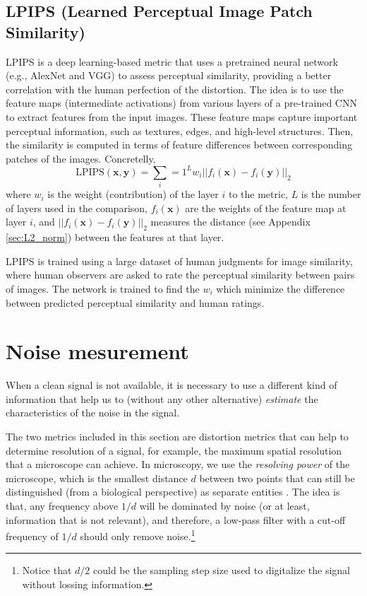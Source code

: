 \documentclass{article}
\begin{document}
\subsection{LPIPS (Learned Perceptual Image Patch Similarity)}

LPIPS \cite{zhang2018unreasonable} is a deep learning-based metric that
uses a pretrained neural network (e.g., AlexNet and VGG) to assess
perceptual similarity, providing a better correlation with the human
perfection of the distortion. The idea is to use the feature maps
(intermediate activations) from various layers of a pre-trained CNN to
extract features from the input images. These feature maps capture
important perceptual information, such as textures, edges, and
high-level structures. Then, the similarity is computed in terms of
feature differences between corresponding patches of the
images. Concretelly,
\begin{equation}
  \text{LPIPS}(\mathbf{x}, \mathbf{y}) = \sum_i=1^Lw_i||f_i(\mathbf{x}) - f_i(\mathbf{y})||_2
\end{equation}
where $w_i$ is the weight (contribution) of the layer $i$ to the
metric, $L$ is the number of layers used in the comparison,
$f_i(\mathbf{x})$ are the weights of the feature map at layer $i$, and
$||f_i(\mathbf{x}) - f_i(\mathbf{y})||_2$ measures the distance (see
Appendix \ref{sec:L2_norm}) between the features at that layer.

LPIPS is trained using a large dataset of human judgments for image
similarity, where human observers are asked to rate the perceptual
similarity between pairs of images. The network is trained to find the
$w_i$ which minimize the difference between predicted perceptual
similarity and human ratings.



\section{Noise mesurement}

When a clean signal is not available, it is necessary to use a
different kind of information that help us to (without any other
alternative) \emph{estimate} the characteristics of the noise in the
signal.

The two metrics included in this section are distortion metrics that
can help to determine resolution of a signal, for example, the maximum
spatial resolution that a microscope can achieve. In microscopy, we
use the \emph{resolving power} of the microscope, which is the
smallest distance $d$ between two points that can still be
distinguished (from a biological perspective) as separate entities
\cite{nieuwenhuizen2013measuring}. The idea is that, any frequency
above $1/d$ will be dominated by noise (or at least, information that
is not relevant), and therefore, a low-pass filter with a cut-off
frequency of $1/d$ should only remove noise.\footnote{Notice that
  $d/2$ could be the sampling step size used to digitalize the signal
  without lossing information.}
\end{document}
